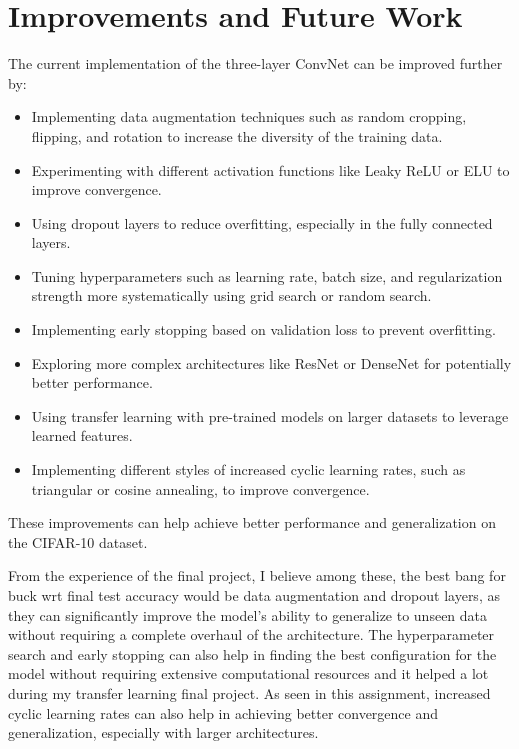 \documentclass[11pt]{article}
\begin{document}
\section*{Improvements and Future Work}

The current implementation of the three-layer ConvNet can be improved further by:

\begin{itemize}
  \item Implementing data augmentation techniques such as random cropping, flipping, and rotation to increase the diversity of the training data.
  \item Experimenting with different activation functions like Leaky ReLU or ELU to improve convergence.
  \item Using dropout layers to reduce overfitting, especially in the fully connected layers.
  \item Tuning hyperparameters such as learning rate, batch size, and regularization strength more systematically using grid search or random search.
  \item Implementing early stopping based on validation loss to prevent overfitting.
  \item Exploring more complex architectures like ResNet or DenseNet for potentially better performance.
  \item Using transfer learning with pre-trained models on larger datasets to leverage learned features.
  \item Implementing different styles of increased cyclic learning rates, such as triangular or cosine annealing, to improve convergence.
\end{itemize}

These improvements can help achieve better performance and generalization on the CIFAR-10 dataset. 

From the experience of the final project, I believe among these, the best bang for buck wrt final test accuracy would be data augmentation and dropout layers, as they can significantly improve the model's ability to generalize to unseen data without requiring a complete overhaul of the architecture.
The hyperparameter search and early stopping can also help in finding the best configuration for the model without requiring extensive computational resources and it helped a lot during my transfer learning final project.
As seen in this assignment, increased cyclic learning rates can also help in achieving better convergence and generalization, especially with larger architectures.
\end{document}
